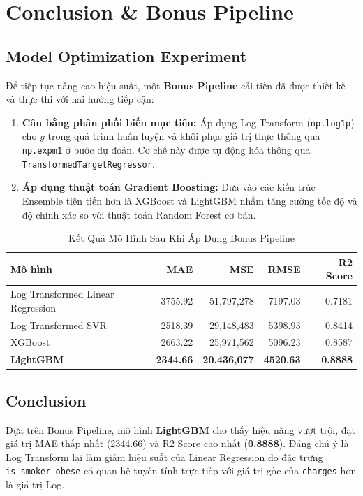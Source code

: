 \section{Conclusion \& Bonus Pipeline}

\subsection{Model Optimization Experiment}
Để tiếp tục nâng cao hiệu suất, một \textbf{Bonus Pipeline} cải tiến đã được thiết kế và thực thi với hai hướng tiếp cận:
\begin{enumerate}
    \item \textbf{Cân bằng phân phối biến mục tiêu:} Áp dụng Log Transform (\texttt{np.log1p}) cho $y$ trong quá trình huấn luyện và khôi phục giá trị thực thông qua \texttt{np.expm1} ở bước dự đoán. Cơ chế này được tự động hóa thông qua \texttt{TransformedTargetRegressor}.
    \item \textbf{Áp dụng thuật toán Gradient Boosting:} Đưa vào các kiến trúc Ensemble tiên tiến hơn là XGBoost và LightGBM nhằm tăng cường tốc độ và độ chính xác so với thuật toán Random Forest cơ bản.
\end{enumerate}

\begin{table}[H]
  \caption{Kết Quả Mô Hình Sau Khi Áp Dụng Bonus Pipeline}
  \label{tab:bonus_results}
  \centering
  \begin{tabular}{lrrrr}
    \toprule
    Mô hình & MAE & MSE & RMSE & R2 Score \\
    \midrule
    Log Transformed Linear Regression & 3755.92 & 51,797,278 & 7197.03 & 0.7181 \\
    Log Transformed SVR & 2518.39 & 29,148,483 & 5398.93 & 0.8414 \\
    XGBoost & 2663.22 & 25,971,562 & 5096.23 & 0.8587 \\
    \textbf{LightGBM} & \textbf{2344.66} & \textbf{20,436,077} & \textbf{4520.63} & \textbf{0.8888} \\
    \bottomrule
  \end{tabular}
\end{table}

\subsection{Conclusion}
Dựa trên Bonus Pipeline, mô hình \textbf{LightGBM} cho thấy hiệu năng vượt trội, đạt giá trị MAE thấp nhất (2344.66) và R2 Score cao nhất (\textbf{0.8888}). Đáng chú ý là Log Transform lại làm giảm hiệu suất của Linear Regression do đặc trưng \texttt{is\_smoker\_obese} có quan hệ tuyến tính trực tiếp với giá trị gốc của \texttt{charges} hơn là giá trị Log.

